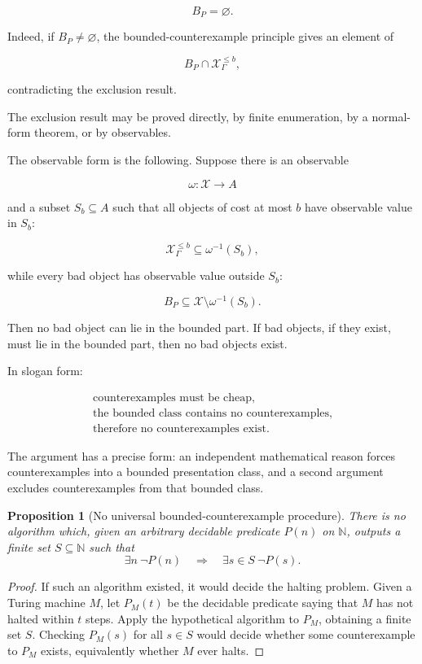 \documentclass[11pt]{article}
\newtheorem{proposition}[theorem]{Proposition}
\begin{document}
\[
B_P=\varnothing.
\]

Indeed, if \(B_P\neq\varnothing\), the bounded-counterexample principle gives an element of

\[
B_P\cap \mathcal X_\Gamma^{\leq b},
\]

contradicting the exclusion result.

The exclusion result may be proved directly, by finite enumeration, by a normal-form theorem, or by observables.

The observable form is the following. Suppose there is an observable

\[
\omega:\mathcal X\to A
\]

and a subset \(S_b\subseteq A\) such that all objects of cost at most \(b\) have observable value in \(S_b\):

\[
\mathcal X_\Gamma^{\leq b}\subseteq \omega^{-1}(S_b),
\]

while every bad object has observable value outside \(S_b\):

\[
B_P\subseteq \mathcal X\setminus \omega^{-1}(S_b).
\]

Then no bad object can lie in the bounded part. If bad objects, if they exist, must lie in the bounded part, then no bad objects exist.

In slogan form:

\[
\begin{gathered}
\text{counterexamples must be cheap,}\\
\text{the bounded class contains no counterexamples,}\\
\text{therefore no counterexamples exist.}
\end{gathered}
\]

The argument has a precise form: an independent mathematical reason forces counterexamples into a bounded presentation class, and a second argument excludes counterexamples from that bounded class.


\begin{proposition}[No universal bounded-counterexample procedure]
There is no algorithm which, given an arbitrary decidable predicate \(P(n)\) on \(\mathbb N\), outputs a finite set \(S\subseteq\mathbb N\) such that
\[
\exists n\ \neg P(n)
\quad\Longrightarrow\quad
\exists s\in S\ \neg P(s).
\]
\end{proposition}

\begin{proof}
If such an algorithm existed, it would decide the halting problem. Given a Turing machine \(M\), let \(P_M(t)\) be the decidable predicate saying that \(M\) has not halted within \(t\) steps. Apply the hypothetical algorithm to \(P_M\), obtaining a finite set \(S\). Checking \(P_M(s)\) for all \(s\in S\) would decide whether some counterexample to \(P_M\) exists, equivalently whether \(M\) ever halts.
\end{proof}
\end{document}

